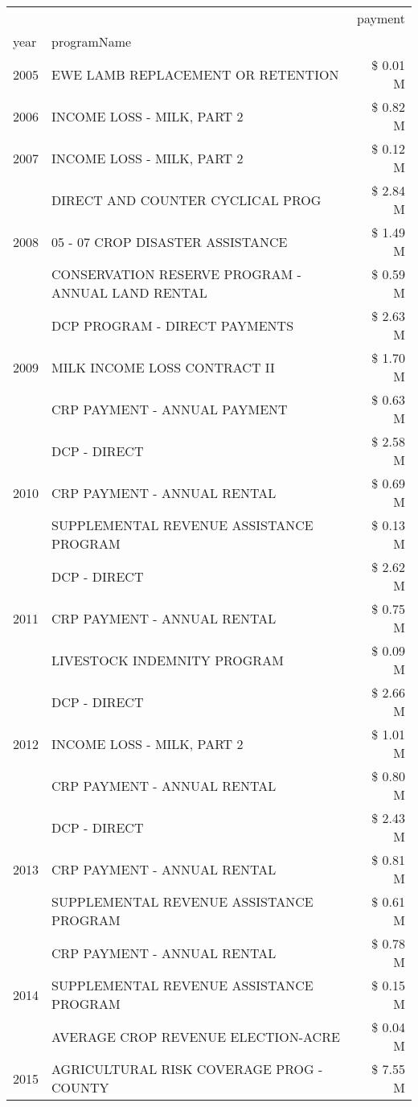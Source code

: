 \begin{tabular}{llr}
\toprule
 &  & payment \\
year & programName &  \\
\midrule
2005 & EWE LAMB REPLACEMENT OR RETENTION & \$ 0.01 M \\
\cline{1-3}
2006 & INCOME LOSS - MILK, PART 2 & \$ 0.82 M \\
\cline{1-3}
2007 & INCOME LOSS - MILK, PART 2 & \$ 0.12 M \\
\cline{1-3}
\multirow[t]{3}{*}{2008} & DIRECT AND COUNTER CYCLICAL PROG & \$ 2.84 M \\
 & 05 - 07 CROP DISASTER ASSISTANCE & \$ 1.49 M \\
 & CONSERVATION RESERVE PROGRAM - ANNUAL LAND RENTAL & \$ 0.59 M \\
\cline{1-3}
\multirow[t]{3}{*}{2009} & DCP PROGRAM - DIRECT PAYMENTS & \$ 2.63 M \\
 & MILK INCOME LOSS CONTRACT II & \$ 1.70 M \\
 & CRP PAYMENT - ANNUAL PAYMENT & \$ 0.63 M \\
\cline{1-3}
\multirow[t]{3}{*}{2010} & DCP - DIRECT & \$ 2.58 M \\
 & CRP PAYMENT - ANNUAL RENTAL & \$ 0.69 M \\
 & SUPPLEMENTAL REVENUE ASSISTANCE PROGRAM & \$ 0.13 M \\
\cline{1-3}
\multirow[t]{3}{*}{2011} & DCP - DIRECT & \$ 2.62 M \\
 & CRP PAYMENT - ANNUAL RENTAL & \$ 0.75 M \\
 & LIVESTOCK INDEMNITY PROGRAM & \$ 0.09 M \\
\cline{1-3}
\multirow[t]{3}{*}{2012} & DCP - DIRECT & \$ 2.66 M \\
 & INCOME LOSS - MILK, PART 2 & \$ 1.01 M \\
 & CRP PAYMENT - ANNUAL RENTAL & \$ 0.80 M \\
\cline{1-3}
\multirow[t]{3}{*}{2013} & DCP - DIRECT & \$ 2.43 M \\
 & CRP PAYMENT - ANNUAL RENTAL & \$ 0.81 M \\
 & SUPPLEMENTAL REVENUE ASSISTANCE PROGRAM & \$ 0.61 M \\
\cline{1-3}
\multirow[t]{3}{*}{2014} & CRP PAYMENT - ANNUAL RENTAL & \$ 0.78 M \\
 & SUPPLEMENTAL REVENUE ASSISTANCE PROGRAM & \$ 0.15 M \\
 & AVERAGE CROP REVENUE ELECTION-ACRE & \$ 0.04 M \\
\cline{1-3}
\multirow[t]{3}{*}{2015} & AGRICULTURAL RISK COVERAGE PROG - COUNTY & \$ 7.55 M \\

\end{tabular}
